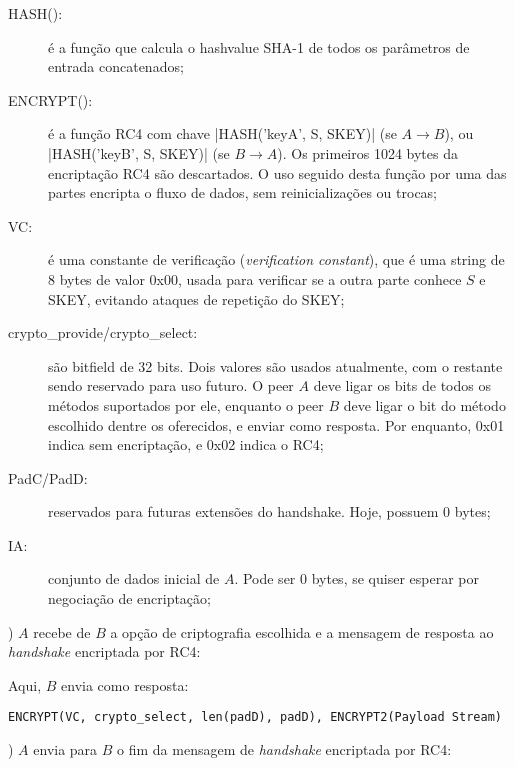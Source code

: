 \begin{description}
    \item[HASH():] é a função que calcula o \gls*{hashvalue} SHA-1 de todos os
        parâmetros de entrada concatenados;

    \item[ENCRYPT():] é a função RC4 com chave \bverb|HASH('keyA', S, SKEY)| (se
        $A \rightarrow B$), ou \bverb|HASH('keyB', S, SKEY)| (se $B \rightarrow A$). Os
        primeiros 1024 bytes da encriptação RC4 são descartados. O uso seguido desta
        função por uma das partes encripta o fluxo de dados, sem reinicializações ou
        trocas;

    \item[VC:] é uma constante de verificação (\emph{verification constant}), que é uma
        string de 8 bytes de valor 0x00, usada para verificar se a outra parte conhece
        $S$ e SKEY, evitando ataques de repetição do SKEY;

    \item[crypto\_provide/crypto\_select:] são bitfield de 32 bits. Dois valores são
        usados atualmente, com o restante sendo reservado para uso futuro. O \gls*{peer}
        $A$ deve ligar os bits de todos os métodos suportados por ele, enquanto o
        \gls*{peer} $B$ deve ligar o bit do método escolhido dentre os oferecidos, e
        enviar como resposta. Por enquanto, 0x01 indica sem encriptação, e 0x02 indica o
        RC4;

    \item[PadC/PadD:] reservados para futuras extensões do handshake. Hoje, possuem 0
         bytes;

    \item[IA:] conjunto de dados inicial de $A$. Pode ser 0 bytes, se quiser esperar por
        negociação de encriptação;
\end{description}

\newpage
{}

) $A$ recebe de $B$ a opção de criptografia escolhida e a mensagem de resposta ao
\emph{handshake} encriptada por RC4:

Aqui, $B$ envia como resposta:

\begin{verbatim}
ENCRYPT(VC, crypto_select, len(padD), padD), ENCRYPT2(Payload Stream)
\end{verbatim}


) $A$ envia para $B$ o fim da mensagem de \emph{handshake} encriptada por RC4:

